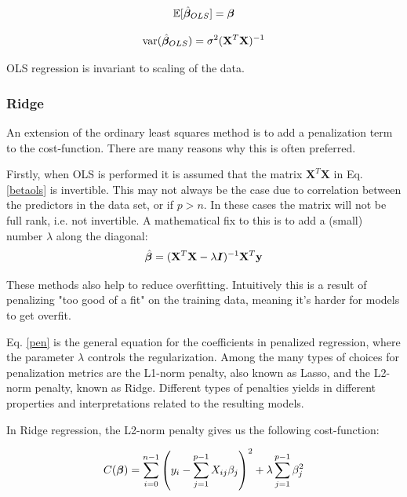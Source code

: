 \begin{equation}\label{ols}
    \mathbb{E}[\hat{\boldsymbol{\beta}}_{OLS}] = \boldsymbol{\beta}
\end{equation}

\begin{equation}
   \text{var}(\hat{\boldsymbol{\beta}}_{OLS}) = \sigma^2 (\mathbf{X}^T\mathbf{X})^{-1}
\end{equation}

OLS regression is invariant to scaling of the data.

\subsubsection{Ridge}


An extension of the ordinary least squares method is to add a penalization term to the cost-function. There are many reasons why this is often preferred. 

Firstly, when OLS is performed it is assumed that the matrix $\boldsymbol{X}^T\boldsymbol{X}$ in Eq. \ref{betaols} is invertible. This may not always be the case due to correlation between the predictors in the data set, or if $p > n$. In these cases the matrix will not be full rank, i.e. not invertible. 
A mathematical fix to this is to add a (small) number $\lambda$ along the diagonal: 
\begin{equation}\label{pen}
    \hat{\boldsymbol{\beta}} = (\mathbf{X}^T\mathbf{X}- \lambda\boldsymbol{I})^{-1}\mathbf{X}^T\mathbf{y}
\end{equation}

These methods also help to reduce overfitting. Intuitively this is a result of penalizing "too good of a fit" on the training data, meaning it's harder for models to get overfit. 

Eq. \ref{pen} is the general equation for the coefficients in penalized regression, where the parameter $\lambda$ controls the regularization. Among the many types of choices for penalization metrics are the L1-norm penalty, also known as Lasso, and the L2-norm penalty, known as Ridge. Different types of penalties yields in different properties and interpretations related to the resulting models.

In Ridge regression, the L2-norm penalty gives us the following cost-function:

\begin{equation}\label{ridge}
     C(\boldsymbol{\beta}) = \sum_{i=0}^{n-1} \left( y_i - \sum_{j=1}^{p-1} X_{ij}\beta_j \right)^2 + \lambda\sum_{j=1}^{p-1} \beta_j^2 
\end{equation}




